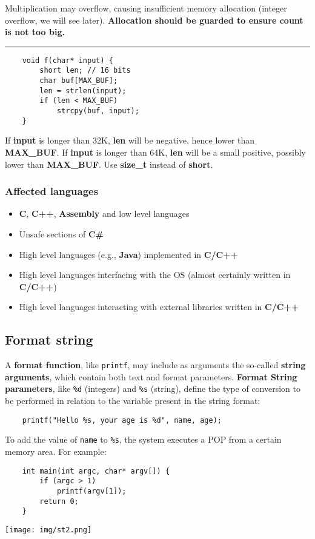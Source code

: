 \documentclass[a4paper, 10pt, titlepage]{article}
\begin{document}
Multiplication may overflow, causing insufficient memory allocation (integer overflow, we will see later).\textbf{ Allocation should be guarded to ensure count is not too big.}
\\\noindent\rule{10cm}{0.4pt}
\begin{lstlisting}
	void f(char* input) {
		short len; // 16 bits
		char buf[MAX_BUF];
		len = strlen(input);
		if (len < MAX_BUF)
			strcpy(buf, input);
	}
\end{lstlisting}
If \textbf{input} is longer than 32K, \textbf{len} will be negative, hence lower than \textbf{MAX\_BUF}. If \textbf{input} is longer than 64K, \textbf{len} will be a small positive, possibly lower than \textbf{MAX\_BUF}. Use \textbf{size\_t} instead of \textbf{short}. \medskip
\subsubsection*{Affected languages}
\begin{itemize}
\item \textbf{C}, \textbf{C++}, \textbf{Assembly} and low level languages
\item Unsafe sections of \textbf{C\#}
\item High level languages (e.g., \textbf{Java}) implemented in \textbf{C/C++}
\item High level languages interfacing with the OS (almost certainly
written in \textbf{C/C++})
\item High level languages interacting with external libraries written in \textbf{C/C++}
\end{itemize}
\newpage
\subsection{Format string}
A \textbf{format function}, like \lstinline|printf|, may include as arguments the so-called \textbf{string arguments}, which contain both text and format parameters. \textbf{Format String parameters}, like \lstinline|%d| (integers) and \lstinline|%s| (string), define the type of conversion to be performed in relation to the variable present in the string format:
\begin{lstlisting}
	printf("Hello %s, your age is %d", name, age);
\end{lstlisting}
To add the value of \lstinline|name| to \lstinline|%s|, the system executes a POP from a certain memory area. For example:\\
\begin{minipage}{0.7\textwidth}
\begin{lstlisting}
	int main(int argc, char* argv[]) {
		if (argc > 1)
			printf(argv[1]);
		return 0;
	}
\end{lstlisting}
\end{minipage}
\begin{minipage}{0.25\textwidth}
\texttt{[image: img/st2.png]}
\end{minipage}
\end{document}
